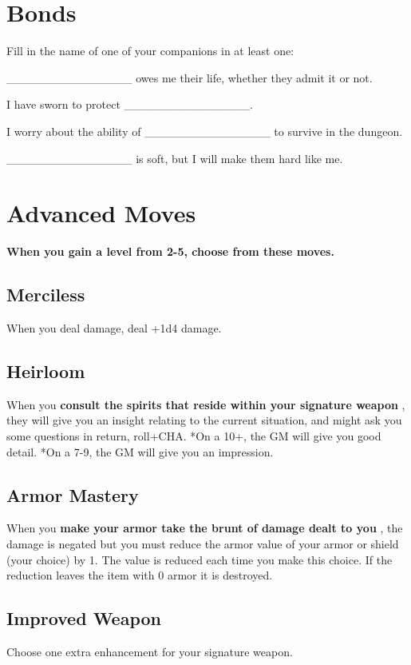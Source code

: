 \section*{Bonds}


 Fill in the name of one of your companions in at least one:


 \_\_\_\_\_\_\_\_\_\_\_\_\_\_\_ owes me their life, whether they admit it or not.


 I have sworn to protect \_\_\_\_\_\_\_\_\_\_\_\_\_\_\_.


 I worry about the ability of \_\_\_\_\_\_\_\_\_\_\_\_\_\_\_ to survive in the dungeon.


 \_\_\_\_\_\_\_\_\_\_\_\_\_\_\_ is soft, but I will make them hard like me.
\section*{Advanced Moves}


 {\bfseries When you gain a level from 2-5, choose from these moves.}
\subsection{Merciless}


 When you deal damage, deal +1d4 damage.
\subsection{Heirloom}


 When you \textbf{consult the spirits that reside within your signature weapon}
, they will give you an insight relating to the current situation, and might ask you some questions in return, roll+CHA. *On a 10+, the GM will give you good detail. *On a 7-9, the GM will give you an impression.
\subsection{Armor Mastery}


 When you \textbf{make your armor take the brunt of damage dealt to you}
, the damage is negated but you must reduce the armor value of your armor or shield (your choice) by 1. The value is reduced each time you make this choice. If the reduction leaves the item with 0 armor it is destroyed.
\subsection{Improved Weapon}


 Choose one extra enhancement for your signature weapon.
